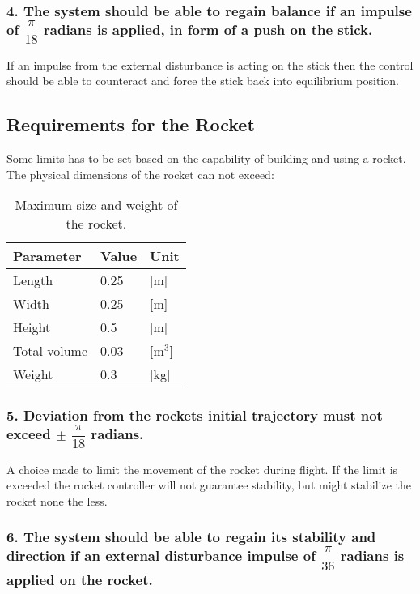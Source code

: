 \subsubsection*{4. The system should be able to regain balance if an impulse of $\dfrac{\pi}{18}$ radians is applied, in form of a push on the stick.} 
\forceindent If an impulse from the external disturbance is acting on the stick then the control should be able to counteract and force the stick back into equilibrium position.   



\subsection{Requirements for the Rocket}
Some limits has to be set based on the capability of building and using a rocket.  
The physical dimensions of the rocket can not exceed:
\begin{table}[htbp]
\centering
\begin{tabular}{lll}
\hline
Parameter    & Value & Unit  \\ \hline
Length       & 0.25  & [m]     \\
Width        & 0.25  & [m]     \\
Height       & 0.5   & [m]     \\
Total volume & 0.03  & [m$^3$] \\
Weight       & 0.3   & [kg]   
\end{tabular}
\caption{Maximum size and weight of the rocket.}
\label{RocketDimensions}
\end{table}


\subsubsection*{5. Deviation from the rockets initial trajectory must not exceed $\pm$ $\dfrac{\pi}{18}$ radians.} 

\forceindent A choice made to limit the movement of the rocket during flight. If the limit is exceeded the rocket controller will not guarantee stability, but might stabilize the rocket none the less.      

\subsubsection*{6. The system should be able to regain its stability and direction if an external disturbance impulse of $\dfrac{\pi}{36}$ radians is applied on the rocket.} 

